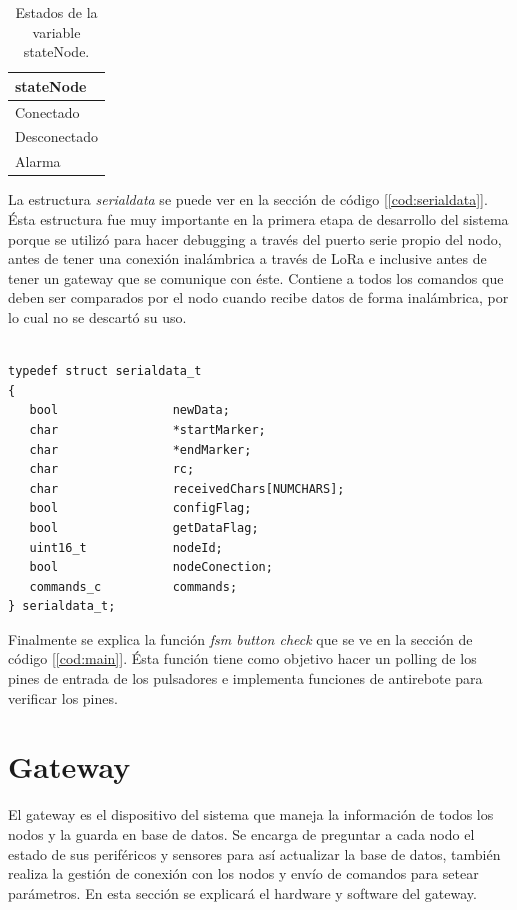 \begin{table}[h]
	\centering
	\caption[Estados de conexión]{Estados de la variable stateNode.}
	\begin{tabular}{l}    
		\toprule
		\textbf{stateNode}		\\
		\midrule
		Conectado				\\
		Desconectado			\\
		Alarma					\\
		\bottomrule
		\hline
	\end{tabular}
	\label{tab:lora}
\end{table}

La estructura {\textit{serialdata}} se puede ver en la sección de código [\ref{cod:serialdata}]. Ésta estructura fue muy importante en la primera etapa de desarrollo del sistema porque se utilizó para hacer debugging a través del puerto serie propio del nodo, antes de tener una conexión inalámbrica a través de LoRa e inclusive antes de tener un gateway que se comunique con éste. Contiene a todos los comandos que deben ser comparados por el nodo cuando recibe datos de forma inalámbrica, por lo cual no se descartó su uso.

\begin{lstlisting}[label=cod:serialdata,caption=Estructura de control de comandos por el puerto serie.] 

typedef struct serialdata_t
{
   bool                newData;
   char                *startMarker;
   char                *endMarker;
   char                rc;
   char                receivedChars[NUMCHARS];
   bool                configFlag;
   bool                getDataFlag;
   uint16_t            nodeId;
   bool                nodeConection;
   commands_c          commands;
} serialdata_t;

\end{lstlisting}

Finalmente se explica la función {\textit{fsm button check}} que se ve en la sección de código [\ref{cod:main}]. Ésta función tiene como objetivo hacer un polling de los pines de entrada de los pulsadores e implementa funciones de antirebote para verificar los pines.


\section{Gateway}
\label{sec:gateway}

El gateway es el dispositivo del sistema que maneja la información de todos los nodos y la guarda en base de datos. Se encarga de preguntar a cada nodo el estado de sus periféricos y sensores para así actualizar la base de datos, también realiza la gestión de conexión con los nodos y envío de comandos para setear parámetros. En esta sección se explicará el hardware y software del gateway.

